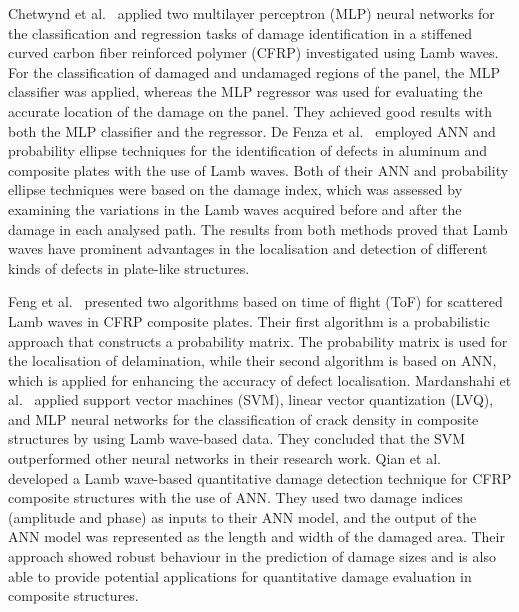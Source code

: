 \begin{sloppypar}
	Chetwynd et al.~\cite{chetwynd2008damage} applied two multilayer perceptron (MLP) neural networks for the classification and regression tasks of damage identification in a stiffened curved carbon fiber reinforced polymer (CFRP) investigated using Lamb waves.
	For the classification of damaged and undamaged regions of the panel, the MLP classifier was applied, whereas the MLP regressor was used for evaluating the accurate location of the damage on the panel. 
	They achieved good results with both the MLP classifier and the regressor.
	De Fenza et al.~\cite{de2015application} employed ANN and probability ellipse techniques for the identification of defects in aluminum and composite plates with the use of Lamb waves.
	Both of their ANN and probability ellipse techniques were based on the damage index, which was assessed by examining the variations in the Lamb waves acquired before and after the damage in each analysed path.
	The results from both methods proved that Lamb waves have prominent advantages in the localisation and detection of different kinds of defects in plate-like structures.
	
	Feng et al.~\cite{feng2019locating} presented two algorithms based on time of flight (ToF) for scattered Lamb waves in CFRP composite plates.
	Their first algorithm is a probabilistic approach that constructs a probability matrix. 
	The probability matrix is used for the localisation of delamination, while their second algorithm is based on ANN, which is applied for enhancing the accuracy of defect localisation.
	Mardanshahi et al.~\cite{mardanshahi2020detection} applied support vector machines (SVM), linear vector quantization (LVQ), and MLP neural networks for the classification of crack density in composite structures by using Lamb wave-based data.
	They concluded that the SVM outperformed other neural networks in their research work.
	Qian et al.~\cite{qian2020application} developed a Lamb wave-based quantitative damage detection technique for CFRP composite structures with the use of ANN.
	They used two damage indices (amplitude and phase) as inputs to their ANN model, and the output of the ANN model was represented as the length and width of the damaged area.
	Their approach showed robust behaviour in the prediction of damage sizes and is also able to provide potential applications for quantitative damage evaluation in composite structures.
	

\end{sloppypar}
